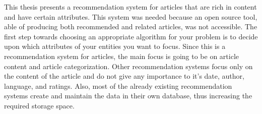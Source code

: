 
This thesis presents a recommendation system for articles that are rich in content and have certain attributes. This system was needed because an open source tool, able of producing both recommended and related articles, was not accessible. The first step towards choosing an appropriate algorithm for your problem is to decide upon which attributes of your entities you want to focus. Since this is a recommendation system for articles, the main focus is going to be on article content and article categorization. Other recommendation systems focus only on the content of the article and do not give any importance to it's date, author, language, and ratings. Also, most of the already existing recommendation systems create and maintain the data in their own database, thus increasing the required storage space.
